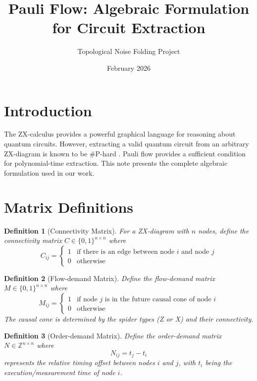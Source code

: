 \documentclass{article}
\newtheorem{definition}{Definition}
\begin{document}
\title{Pauli Flow: Algebraic Formulation for Circuit Extraction}
\author{Topological Noise Folding Project}
\date{February 2026}

\maketitle

\section{Introduction}

The ZX-calculus provides a powerful graphical language for reasoning about quantum circuits. However, extracting a valid quantum circuit from an arbitrary ZX-diagram is known to be \#P-hard \cite{deBeaudrap2022}. Pauli flow \cite{Mitosek2026} provides a sufficient condition for polynomial-time extraction. This note presents the complete algebraic formulation used in our work.

\section{Matrix Definitions}

\begin{definition}[Connectivity Matrix]
For a ZX-diagram with $n$ nodes, define the connectivity matrix $C \in \{0,1\}^{n \times n}$ where
\begin{equation}
C_{ij} = \begin{cases}
1 & \text{if there is an edge between node $i$ and node $j$} \\
0 & \text{otherwise}
\end{cases}
\end{equation}
\end{definition}

\begin{definition}[Flow-demand Matrix]
Define the flow-demand matrix $M \in \{0,1\}^{n \times n}$ where
\begin{equation}
M_{ij} = \begin{cases}
1 & \text{if node $j$ is in the future causal cone of node $i$} \\
0 & \text{otherwise}
\end{cases}
\end{equation}
The causal cone is determined by the spider types (Z or X) and their connectivity.
\end{definition}

\begin{definition}[Order-demand Matrix]
Define the order-demand matrix $N \in \mathbb{Z}^{n \times n}$ where
\begin{equation}
N_{ij} = t_j - t_i
\end{equation}
represents the relative timing offset between nodes $i$ and $j$, with $t_i$ being the execution/measurement time of node $i$.
\end{definition}
\end{document}

